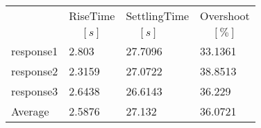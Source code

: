 \begin{tabular}{llll}
  & RiseTime & SettlingTime & Overshoot  \\ 
  & $\;\;\;\;[s]$ & $\;\;\;\;[s]$ & $\;\;\;\;[\%]$  \\ 
\hline 
response1 & 2.803 & 27.7096 & 33.1361 \\ 
response2 & 2.3159 & 27.0722 & 38.8513  \\ 
response3 & 2.6438 & 26.6143 & 36.229  \\ 
Average & 2.5876 & 27.132 & 36.0721  \\ 
\hline 
\end{tabular}
